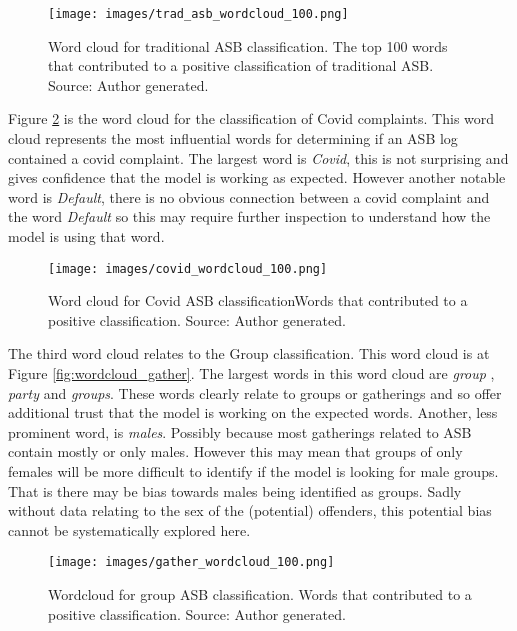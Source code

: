 \begin{figure}[h]
    \texttt{[image: images/trad\_asb\_wordcloud\_100.png]}
    \caption[Word cloud for traditional ASB classification.]{{Word cloud for traditional ASB classification.} The top 100 words that contributed to a positive classification of traditional ASB. Source: Author generated.}
    \label{fig: wordcloud_trad}
\end{figure}

Figure \ref{fig: wordcloud_covid} is the word cloud for the classification of Covid complaints. This word cloud represents the most influential words for determining if an ASB log contained a covid complaint. The largest word is \emph{Covid}, this is not surprising and gives confidence that the model is working as expected. However another notable word is \emph{Default}, there is no obvious connection between a covid complaint and the word \emph{Default}  so this may require further inspection to understand how the model is using that word.


\begin{figure}[h]
    \centering
    \texttt{[image: images/covid\_wordcloud\_100.png]}
    \caption[Word cloud for Covid ASB classification]{{Word cloud for Covid ASB classification}Words that contributed to a positive classification. Source: Author generated.}
    \label{fig: wordcloud_covid}
\end{figure}

The third word cloud relates to the Group classification. This word cloud is at Figure \ref{fig:wordcloud_gather}. The largest words in this word cloud are \emph{group} , \emph{party} and \emph{groups}. These words clearly relate to groups or gatherings and so offer additional trust that the model is working on the expected words. Another, less prominent word, is \emph{males}. Possibly because most gatherings related to ASB contain mostly or only males. However this may mean that groups of only females will be more difficult to identify if the model is looking for male groups. That is there may be bias towards males being identified as groups. Sadly without data relating to the sex of the (potential) offenders, this potential bias cannot be systematically explored here. 


\begin{figure}[h]
    \texttt{[image: images/gather\_wordcloud\_100.png]}
    \caption[Wordcloud for group ASB classification.]{{Wordcloud for group ASB classification.} Words that contributed to a positive classification. Source: Author generated.}
    \label{fig: wordcloud_gather}
\end{figure}
   


